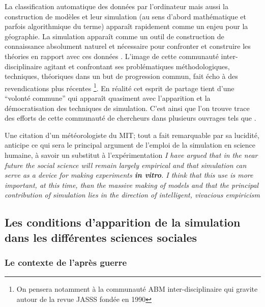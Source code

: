 La classification automatique des données par l'ordinateur mais aussi la construction de modèles et leur simulation (au sens d'abord mathématique et parfois algorithmique du terme) apparaît rapidement comme un enjeu pour la géographie. La simulation apparaît comme un outil de construction de connaissance absolument naturel et nécessaire pour confronter et construire les théories en rapport avec ces données \autocite{Kao1963, Hagerstrand1967b}. L'image de cette communauté inter-disciplinaire agitant et confrontant ses problématiques méthodologiques, techniques, théoriques dans un but de progression commun, fait écho à des revendications plus récentes \footnote{On pensera notamment à la communauté ABM inter-disciplinaire qui gravite autour de la revue JASSS fondée en  1990}. En réalité cet esprit de partage tient d'une \enquote{volonté commune} qui apparaît quasiment avec l'apparition et la démocratisation des techniques de simulation. C'est ainsi que l'on trouve trace des efforts de cette communauté de chercheurs dans plusieurs ouvrages tels que \autocite{Beshers1965,Naylor1966,Dutton1971,Guetzkow1962,Guetzkow1972}.

Une citation d'un météorologiste du MIT; tout a fait remarquable par sa lucidité, anticipe ce qui sera le principal argument de l'emploi de la simulation en science humaine, à savoir un substitut à l'expérimentation \textit{I have argued that in the near future the social science will remain largely empirical and that simulation can serve as a device for making experiments \textbf{in vitro}. I think that this use is more important, at this time, than the massive making of models and that the principal contribution of simulation lies in the direction of intelligent, vivacious empiricism} \autocite{Fleisher1965}



\subsection{Les conditions d'apparition de la simulation dans les différentes sciences sociales }

\subsubsection{Le contexte de l'après guerre}

